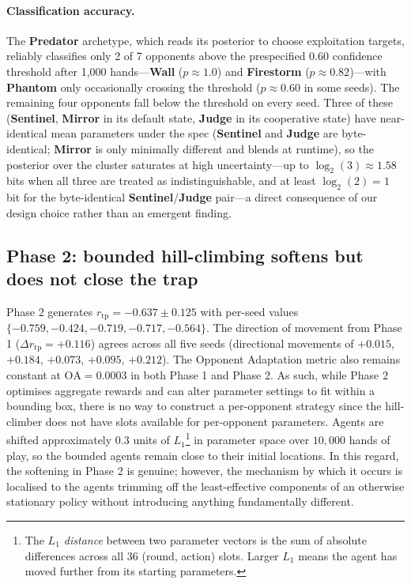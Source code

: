 \documentclass[10pt]{article} %
\newcommand{\arch}[1]{\textbf{#1}}
\newcommand{\rtp}{\ensuremath{r_{\mathrm{tp}}}}
\begin{document}
\paragraph{Classification accuracy.}
The \arch{Predator} archetype, which reads its posterior to
choose exploitation targets, reliably classifies only 2 of 7
opponents above the prespecified 0.60 confidence threshold after
1{,}000 hands---\arch{Wall} ($p \approx 1.0$) and \arch{Firestorm}
($p \approx 0.82$)---with \arch{Phantom} only occasionally crossing
the threshold ($p \approx 0.60$ in some seeds). The remaining four opponents
fall below the threshold on every seed. Three of these
(\arch{Sentinel}, \arch{Mirror} in its default state,
\arch{Judge} in its cooperative state) have near-identical mean
parameters under the spec (\arch{Sentinel} and \arch{Judge} are
byte-identical; \arch{Mirror} is only minimally different and blends
at runtime), so the posterior over the cluster saturates at high
uncertainty---up to $\log_2(3) \approx 1.58$ bits when all three are
treated as indistinguishable, and at least $\log_2(2) = 1$ bit for
the byte-identical \arch{Sentinel}/\arch{Judge} pair---a direct
consequence of our design choice rather than an emergent finding.


\subsection{Phase 2: bounded hill-climbing softens but does not
close the trap}

Phase 2 generates $\rtp = -0.637 \pm 0.125$ with per-seed values
$\{-0.759, -0.424, -0.719, -0.717, -0.564\}$. The direction of
movement from Phase 1 ($\Delta\rtp = +0.116$) agrees across all five
seeds (directional movements of $+0.015$, $+0.184$, $+0.073$,
$+0.095$, $+0.212$). The Opponent Adaptation metric also remains
constant at $\mathrm{OA} = 0.0003$ in both Phase 1 and Phase 2. As
such, while Phase 2 optimises aggregate rewards and can alter
parameter settings to fit within a bounding box, there is no way to
construct a per-opponent strategy since the hill-climber does not
have slots available for per-opponent parameters. Agents are shifted
approximately $0.3$ units of $L_1$\footnote{The \textit{$L_1$
distance} between two parameter vectors is the sum of absolute
differences across all 36 (round, action) slots. Larger $L_1$ means
the agent has moved further from its starting parameters.} in
parameter space over $10{,}000$ hands of play, so the bounded agents
remain close to their initial locations. In this regard, the
softening in Phase 2 is genuine; however, the mechanism by which it
occurs is localised to the agents trimming off the least-effective
components of an otherwise stationary policy without introducing
anything fundamentally different.
\end{document}
